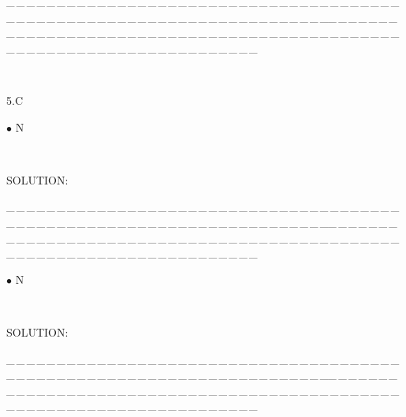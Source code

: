 \documentclass[a4paper, 11pt, UTF8]{article}
\begin{document}
\begin{large}
\par
{\tiny \_\,\_\,\_\,\_\,\_\,\_\,\_\,\_\,\_\,\_\,\_\,\_\,\_\,\_\,\_\,\_\,\_\,\_\,\_\,\_\,\_\,\_\,\_\,\_\,\_\,\_\,\_\,\_\,\_\,\_\,\_\,\_\,\_\,\_\,\_\,\_\,\_\,\_\,\_\,\_\,\_\,\_\,\_\,\_\,\_\,\_\,\_\,\_\,\_\,\_\,\_\,\_\,\_\,\_\,\_\,\_\,\_\,\_\,\_\,\_\,\_\,\_\,\_\,\_\,\_\,\_\,\_\,\_\,\_\,\_\,\_\_\,\_\,\_\,\_\,\_\,\_\,\_\,\_\,\_\,\_\,\_\,\_\,\_\,\_\,\_\,\_\,\_\,\_\,\_\,\_\,\_\,\_\,\_\,\_\,\_\,\_\,\_\,\_\,\_\,\_\,\_\,\_\,\_\,\_\,\_\,\_\,\_\,\_\,\_\,\_\,\_\,\_\,\_\,\_\,\_\,\_\,\_\,\_\,\_\,\_\,\_\,\_\,\_\,\_\,\_\,\_\,\_\,\_\,\_\,\_\,\_\,\_\,\_\,\_\,\_\,\_\,\_\,\_\,\_\,\_\,\_}\par

\par{\tiny\,\par}

{\huge\timesbf 5.C} %


{\small $\bullet$}
{\timesbf\Large N} {\timessl\Large 
}\par\quad\,
{\timessl\Large
}\par
{\timesbf S\footnotesize{OLUTION:}}\par\quad

\par
{\tiny \_\,\_\,\_\,\_\,\_\,\_\,\_\,\_\,\_\,\_\,\_\,\_\,\_\,\_\,\_\,\_\,\_\,\_\,\_\,\_\,\_\,\_\,\_\,\_\,\_\,\_\,\_\,\_\,\_\,\_\,\_\,\_\,\_\,\_\,\_\,\_\,\_\,\_\,\_\,\_\,\_\,\_\,\_\,\_\,\_\,\_\,\_\,\_\,\_\,\_\,\_\,\_\,\_\,\_\,\_\,\_\,\_\,\_\,\_\,\_\,\_\,\_\,\_\,\_\,\_\,\_\,\_\,\_\,\_\,\_\,\_\_\,\_\,\_\,\_\,\_\,\_\,\_\,\_\,\_\,\_\,\_\,\_\,\_\,\_\,\_\,\_\,\_\,\_\,\_\,\_\,\_\,\_\,\_\,\_\,\_\,\_\,\_\,\_\,\_\,\_\,\_\,\_\,\_\,\_\,\_\,\_\,\_\,\_\,\_\,\_\,\_\,\_\,\_\,\_\,\_\,\_\,\_\,\_\,\_\,\_\,\_\,\_\,\_\,\_\,\_\,\_\,\_\,\_\,\_\,\_\,\_\,\_\,\_\,\_\,\_\,\_\,\_\,\_\,\_\,\_\,\_}\par

{\small $\bullet$}
{\timesbf\Large N} {\timessl\Large 
}\par\quad\,
{\timessl\Large
}\par
{\timesbf S\footnotesize{OLUTION:}}\par\quad

\par
{\tiny \_\,\_\,\_\,\_\,\_\,\_\,\_\,\_\,\_\,\_\,\_\,\_\,\_\,\_\,\_\,\_\,\_\,\_\,\_\,\_\,\_\,\_\,\_\,\_\,\_\,\_\,\_\,\_\,\_\,\_\,\_\,\_\,\_\,\_\,\_\,\_\,\_\,\_\,\_\,\_\,\_\,\_\,\_\,\_\,\_\,\_\,\_\,\_\,\_\,\_\,\_\,\_\,\_\,\_\,\_\,\_\,\_\,\_\,\_\,\_\,\_\,\_\,\_\,\_\,\_\,\_\,\_\,\_\,\_\,\_\,\_\_\,\_\,\_\,\_\,\_\,\_\,\_\,\_\,\_\,\_\,\_\,\_\,\_\,\_\,\_\,\_\,\_\,\_\,\_\,\_\,\_\,\_\,\_\,\_\,\_\,\_\,\_\,\_\,\_\,\_\,\_\,\_\,\_\,\_\,\_\,\_\,\_\,\_\,\_\,\_\,\_\,\_\,\_\,\_\,\_\,\_\,\_\,\_\,\_\,\_\,\_\,\_\,\_\,\_\,\_\,\_\,\_\,\_\,\_\,\_\,\_\,\_\,\_\,\_\,\_\,\_\,\_\,\_\,\_\,\_\,\_}\par


\end{large}
\end{document}

